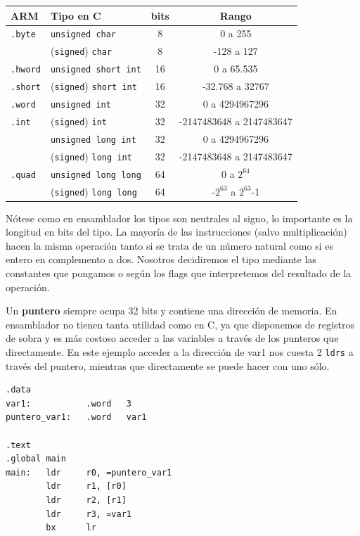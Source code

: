 \begin{descript}
\vspace{1cm}
\begin{center}
\begin{tabular}{|l|l|c|c|}\hline
 ARM & Tipo en C & bits & Rango \\ \hline
 {\tt .byte}  & {\tt unsigned char} & 8 & 0 a 255 \\
              & ({\tt signed}) {\tt char} & 8 & -128 a 127 \\ \hline
 {\tt .hword} & {\tt unsigned short int} & 16 &  0 a 65.535 \\
 {\tt .short} & ({\tt signed}) {\tt short int} & 16 & -32.768 a 32767 \\ \hline
 {\tt .word}  & {\tt unsigned int} & 32 & 0 a 4294967296 \\
 {\tt .int}   & ({\tt signed}) {\tt int} &  32 & -2147483648 a 2147483647 \\
              & {\tt unsigned long int}  & 32 & 0 a 4294967296 \\ 
              & ({\tt signed}) {\tt long int} &  32 & -2147483648 a 2147483647 \\ \hline
 {\tt .quad}  & {\tt unsigned long long} & 64 &  0 a $2^{64}$ \\
              & ({\tt signed}) {\tt long long} & 64 & -$2^{63}$ a $2^{63}$-1 \\ \hline
\end{tabular}
\end{center}

Nótese como en ensamblador los tipos son neutrales al signo, lo importante
es la longitud en bits del tipo. La mayoría de las instrucciones (salvo
multiplicación) hacen la misma operación tanto si se trata de un número
natural como si es entero en complemento a dos. Nosotros decidiremos el tipo
mediante las constantes que pongamos o según los flags que interpretemos del
resultado de la operación.
\end{descript}


 Un {\bf puntero} siempre ocupa 32 bits y contiene
una dirección de memoria. En ensamblador no tienen tanta utilidad como en C,
ya que disponemos de registros de sobra y es más costoso acceder a
las variables a través de los punteros que directamente. En este ejemplo
acceder a la dirección de var1 nos cuesta 2 {\tt ldrs} a través del puntero,
mientras que directamente se puede hacer con uno sólo.

\newpage
\begin{lstlisting}
.data
var1:           .word   3
puntero_var1:   .word   var1

.text
.global main
main:   ldr     r0, =puntero_var1
        ldr     r1, [r0]
        ldr     r2, [r1]
        ldr     r3, =var1
        bx      lr
\end{lstlisting}

